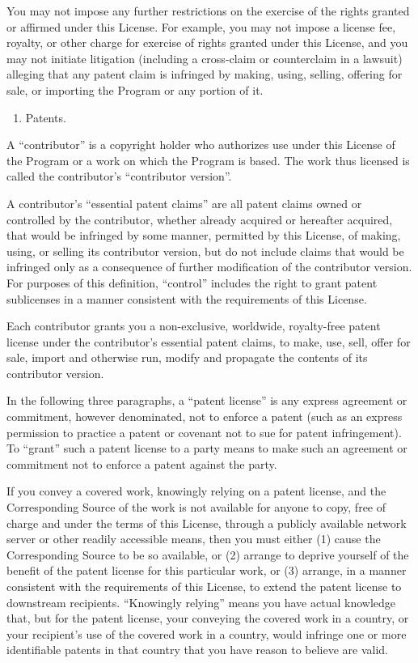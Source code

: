 \documentclass[letterpaper,10pt,english]{sphinxmanual}
\begin{document}
You may not impose any further restrictions on the exercise of the
rights granted or affirmed under this License.  For example, you may
not impose a license fee, royalty, or other charge for exercise of
rights granted under this License, and you may not initiate litigation
(including a cross-claim or counterclaim in a lawsuit) alleging that
any patent claim is infringed by making, using, selling, offering for
sale, or importing the Program or any portion of it.
\begin{enumerate}
%
\setcounter{enumi}{10}
\item {} 
Patents.

\end{enumerate}

A “contributor” is a copyright holder who authorizes use under this
License of the Program or a work on which the Program is based.  The
work thus licensed is called the contributor’s “contributor version”.

A contributor’s “essential patent claims” are all patent claims
owned or controlled by the contributor, whether already acquired or
hereafter acquired, that would be infringed by some manner, permitted
by this License, of making, using, or selling its contributor version,
but do not include claims that would be infringed only as a
consequence of further modification of the contributor version.  For
purposes of this definition, “control” includes the right to grant
patent sublicenses in a manner consistent with the requirements of
this License.

Each contributor grants you a non-exclusive, worldwide, royalty-free
patent license under the contributor’s essential patent claims, to
make, use, sell, offer for sale, import and otherwise run, modify and
propagate the contents of its contributor version.

In the following three paragraphs, a “patent license” is any express
agreement or commitment, however denominated, not to enforce a patent
(such as an express permission to practice a patent or covenant not to
sue for patent infringement).  To “grant” such a patent license to a
party means to make such an agreement or commitment not to enforce a
patent against the party.

If you convey a covered work, knowingly relying on a patent license,
and the Corresponding Source of the work is not available for anyone
to copy, free of charge and under the terms of this License, through a
publicly available network server or other readily accessible means,
then you must either (1) cause the Corresponding Source to be so
available, or (2) arrange to deprive yourself of the benefit of the
patent license for this particular work, or (3) arrange, in a manner
consistent with the requirements of this License, to extend the patent
license to downstream recipients.  “Knowingly relying” means you have
actual knowledge that, but for the patent license, your conveying the
covered work in a country, or your recipient’s use of the covered work
in a country, would infringe one or more identifiable patents in that
country that you have reason to believe are valid.
\end{document}
